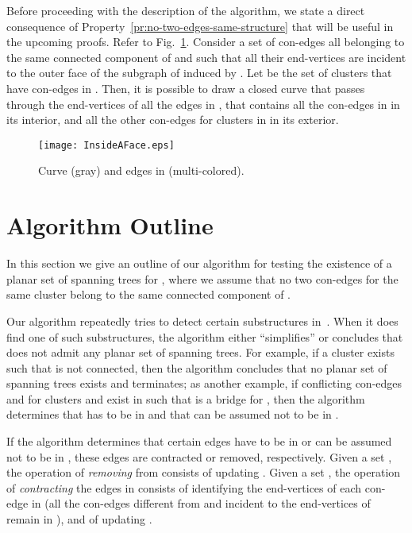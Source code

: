 \documentclass[letter,runningheads]{llncs}
\begin{document}
Before proceeding with the description of the algorithm, we state a direct consequence of Property~\ref{pr:no-two-edges-same-structure} that will be useful in the upcoming proofs. Refer to Fig.~\ref{fig:inside-a-face}. Consider a set  of con-edges all belonging to the same connected component of  and such that all their end-vertices are incident to the outer face of the subgraph of  induced by . Let  be the set of clusters that have con-edges in . Then, it is possible to draw a closed curve  that passes through the end-vertices of all the edges in , that contains all the con-edges in  in its interior, and all the other con-edges for clusters in  in its exterior.

\begin{figure}[htb]
\begin{center}
\mbox{\texttt{[image: InsideAFace.eps]}}
\caption{Curve  (gray) and edges in  (multi-colored).}
\label{fig:inside-a-face}
\end{center}
\end{figure}

\section{Algorithm Outline} \label{se:outline}

In this section we give an outline of our algorithm for testing the existence of a planar set  of spanning trees for , where we assume that no two con-edges for the same cluster belong to the same connected component of .

Our algorithm repeatedly tries to detect certain substructures in~. When it does find one of such substructures, the algorithm either ``simplifies''  or concludes that  does not admit any planar set of spanning trees. For example, if a cluster  exists such that  is not connected, then the algorithm concludes that no planar set of spanning trees exists and terminates; as another example, if conflicting con-edges  and  for clusters  and  exist in  such that  is a bridge for , then the algorithm determines that  has to be in  and that  can be assumed not to be in .

If the algorithm determines that certain edges have to be in  or can be assumed not to be in , these edges are contracted or removed, respectively. Given a set , the operation of {\em removing}  from  consists of updating . Given a set , the operation of {\em contracting} the edges in  consists of identifying the end-vertices of each con-edge  in  (all the con-edges different from  and incident to the end-vertices of  remain in ), and of updating .
\end{document}

